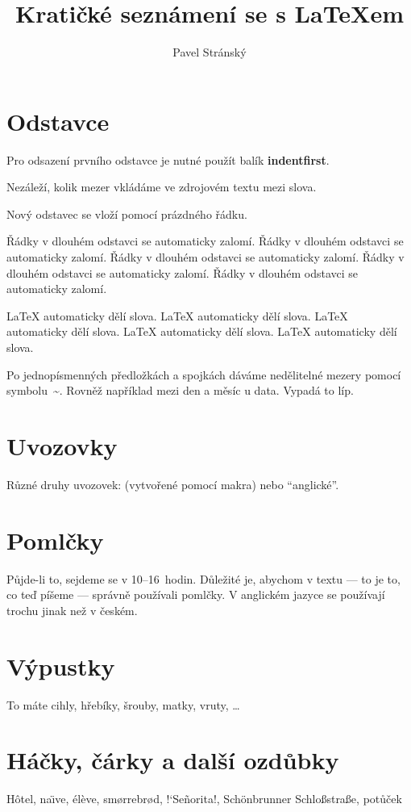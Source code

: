 \documentclass{article}
\author{Pavel Stránský}
\title{Kratičké seznámení se s \LaTeX em}
\def\uv#1{\clqq{#1}\crqq}
\begin{document}
	\maketitle
	
	\section{Odstavce}	
	\label{sec:odstavce}
	Pro odsazení prvního odstavce je nutné použít balík \textbf{indentfirst}.

	Nezáleží,      kolik
	mezer      vkládáme       ve zdrojovém
	textu
	mezi     slova.
	
	Nový odstavec se vloží pomocí prázdného řádku.
	
	Řádky v dlouhém odstavci se automaticky zalomí. 
	Řádky v dlouhém odstavci se automaticky zalomí. 
	Řádky v dlouhém odstavci se automaticky zalomí. 
	Řádky v dlouhém odstavci se automaticky zalomí. 
	Řádky v dlouhém odstavci se automaticky zalomí. 
	
	\LaTeX{} automaticky dělí slova.
	\LaTeX{} automaticky dělí slova.
	\LaTeX{} automaticky dělí slova.
	\LaTeX{} automaticky dělí slova.
	\LaTeX{} automaticky dělí slova.
	
	Po jednopísmenných předložkách a spojkách dáváme nedělitelné mezery pomocí symbolu~\~{}.
	Rovněž například mezi den a měsíc u data.
	Vypadá to líp.
	
	\section{Uvozovky}
	Různé druhy uvozovek: \uv{české} (vytvořené pomocí makra) nebo ``anglické''.

	\section{Pomlčky}
	Půjde-li to, sejdeme se v 10--16~hodin.
	Důležité je, abychom v textu --- to je to, co teď píšeme --- správně používali pomlčky.
	V anglickém jazyce se používají trochu jinak než v českém.
	
	\section{Výpustky}
	To máte cihly, hřebíky, šrouby, matky, vruty, \ldots

	\section{Háčky, čárky a další ozdůbky}
	\label{sec:akcenty}
	H\^otel,
	na\"\i ve, 
	\'el\`eve, 
	sm\o rrebr\o d, 
	!‘Se\~norita!,	
	Sch\"onbrunner Schlo\ss stra\ss e,
	pot\r u\v cek
	
\end{document}
